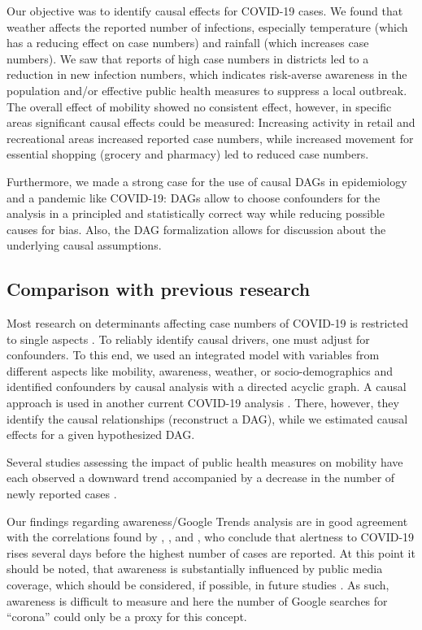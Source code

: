 \documentclass[]{elsarticle} %
\begin{document}
Our objective was to identify causal effects for COVID-19 cases. We
found that weather affects the reported number of infections, especially
temperature (which has a reducing effect on case numbers) and rainfall
(which increases case numbers). We saw that reports of high case numbers
in districts led to a reduction in new infection numbers, which
indicates risk-averse awareness in the population and/or effective
public health measures to suppress a local outbreak. The overall effect
of mobility showed no consistent effect, however, in specific areas
significant causal effects could be measured: Increasing activity in
retail and recreational areas increased reported case numbers, while
increased movement for essential shopping (grocery and pharmacy) led to
reduced case numbers.

Furthermore, we made a strong case for the use of causal DAGs in
epidemiology and a pandemic like COVID-19: DAGs allow to choose
confounders for the analysis in a principled and statistically correct
way while reducing possible causes for bias. Also, the DAG formalization
allows for discussion about the underlying causal assumptions.

\subsection{Comparison with previous
research}\label{comparison-with-previous-research}

Most research on determinants affecting case numbers of COVID-19 is
restricted to single aspects
\citep{fowler_effect_2020, li_retrospective_2020, shi_impact_2020, Wang2020temperature}.
To reliably identify causal drivers, one must adjust for confounders. To
this end, we used an integrated model with variables from different
aspects like mobility, awareness, weather, or socio-demographics and
identified confounders by causal analysis with a directed acyclic graph.
A causal approach is used in another current COVID-19 analysis
\citep{gencoglu2020causal}. There, however, they identify the causal
relationships (reconstruct a DAG), while we estimated causal effects for
a given hypothesized DAG.

Several studies assessing the impact of public health measures on
mobility have each observed a downward trend accompanied by a decrease
in the number of newly reported cases
\citep{chang_modeling_2020, cowling2020impact, fowler_effect_2020, kraemer_effect_2020, lai_effect_2020, linka_outbreak_2020}.

Our findings regarding awareness/Google Trends analysis are in good
agreement with the correlations found by
\citet{effenberger_association_2020}, \citet{higgins_correlations_2020},
and \citet{yuan_trends_2020}, who conclude that alertness to COVID-19
rises several days before the highest number of cases are reported. At
this point it should be noted, that awareness is substantially
influenced by public media coverage, which should be considered, if
possible, in future studies \citep{higgins_correlations_2020}. As such,
awareness is difficult to measure and here the number of Google searches
for ``corona'' could only be a proxy for this concept.
\end{document}
